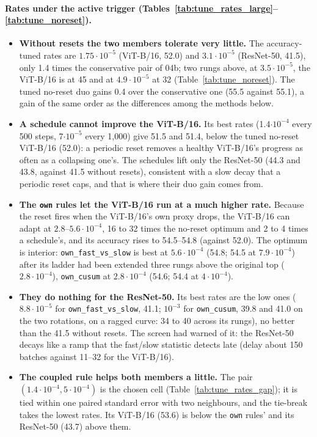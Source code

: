\documentclass[10pt]{article}
\newcommand{\rl}[1]{\texttt{#1}}
\newcommand{\vit}{ViT-B/16}
\newcommand{\rn}{ResNet-50}
\begin{document}
\paragraph{Rates under the active trigger (Tables~\ref{tab:tune_rates_large}--\ref{tab:tune_noreset}).}
\begin{itemize}
  \item \textbf{Without resets the two members tolerate very little.} The accuracy-tuned rates are $1.75 \cdot 10^{-5}$ (\vit{}, 52.0) and $3.1 \cdot 10^{-5}$ (\rn{}, 41.5), only 1.4 times the conservative pair of 04b; two rungs above, at $3.5 \cdot 10^{-5}$, the \vit{} is at 45 and at $4.9 \cdot 10^{-5}$ at 32 (Table~\ref{tab:tune_noreset}). The tuned no-reset duo gains 0.4 over the conservative one (55.5 against 55.1), a gain of the same order as the differences among the methods below.
  \item \textbf{A schedule cannot improve the \vit{}.} Its best rates (1.4$\cdot 10^{-4}$ every 500 steps, 7$\cdot 10^{-5}$ every 1,000) give 51.5 and 51.4, below the tuned no-reset \vit{} (52.0): a periodic reset removes a healthy \vit{}'s progress as often as a collapsing one's. The schedules lift only the \rn{} (44.3 and 43.8, against 41.5 without resets), consistent with a slow decay that a periodic reset caps, and that is where their duo gain comes from.
  \item \textbf{The \rl{own} rules let the \vit{} run at a much higher rate.} Because the reset fires when the \vit{}'s own proxy drops, the \vit{} can adapt at $2.8$--$5.6 \cdot 10^{-4}$, 16 to 32 times the no-reset optimum and 2 to 4 times a schedule's, and its accuracy rises to 54.5--54.8 (against 52.0). The optimum is interior: \rl{own\_fast\_vs\_slow} is best at $5.6 \cdot 10^{-4}$ (54.8; 54.5 at $7.9 \cdot 10^{-4}$) after its ladder had been extended three rungs above the original top ($2.8 \cdot 10^{-4}$), \rl{own\_cusum} at $2.8 \cdot 10^{-4}$ (54.6; 54.4 at $4 \cdot 10^{-4}$).
  \item \textbf{They do nothing for the \rn{}.} Its best rates are the low ones ($8.8 \cdot 10^{-5}$ for \rl{own\_fast\_vs\_slow}, 41.1; $10^{-3}$ for \rl{own\_cusum}, 39.8 and 41.0 on the two rotations, on a ragged curve: 34 to 40 across its rungs), no better than the 41.5 without resets. The screen had warned of it: the \rn{} decays like a ramp that the fast/slow statistic detects late (delay about 150 batches against 11--32 for the \vit{}).
  \item \textbf{The coupled rule helps both members a little.} The pair $(1.4 \cdot 10^{-4}, 5 \cdot 10^{-4})$ is the chosen cell (Table~\ref{tab:tune_rates_gap}); it is tied within one paired standard error with two neighbours, and the tie-break takes the lowest rates. Its \vit{} (53.6) is below the \rl{own} rules' and its \rn{} (43.7) above them.
\end{itemize}
\end{document}
